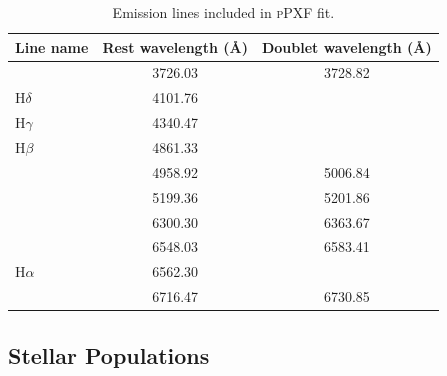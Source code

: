 	 	\begin{table}
	 		\centering
	 	\begin{threeparttable}
	 		\caption{Emission lines included in \textsc{pPXF} fit.}
	 		\label{tab:EmissionLine}
	 		\begin{tabular}{l c c}
	 		\hline
	 		\hline
	 		Line name 		& Rest wavelength (\AA) & Doublet wavelength (\AA) \\
	 		\hline
	 		[\ion{O}{ii}] 	& 3726.03 & 3728.82 \\
	 		H$\delta$ 		& 4101.76 & \\
	 		H$\gamma$ 		& 4340.47 & \\
	 		H$\beta$ 		& 4861.33 & \\
	 		[\ion{O}{iii}] 	& 4958.92 & 5006.84 \\
	 		[\ion{N}{i}] 	& 5199.36 & 5201.86 \\
	 		[\ion{O}{i}] 	& 6300.30 & 6363.67 \\
	 		[\ion{N}{ii}] 	& 6548.03 & 6583.41 \\
	 		H$\alpha$ 		& 6562.30 &\\
	 		[\ion{S}{ii}] 	& 6716.47 & 6730.85 \\
	 		\hline
	 		\hline
	 		\end{tabular}
	 	\end{threeparttable}
	 	\end{table}




	 \subsection{Stellar Populations}
	 	\label{subsec:PopFit}



